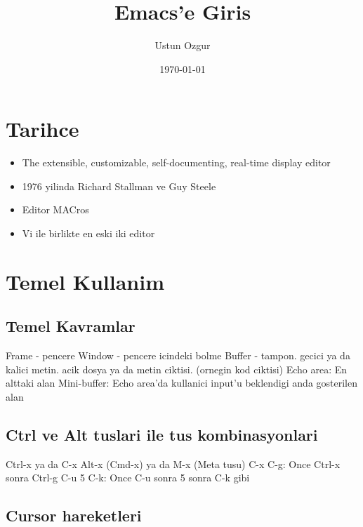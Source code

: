 \documentclass[11pt]{article}
\author{Ustun Ozgur}
\date{\today}
\title{Emacs'e Giris}
\begin{document}
\maketitle
\tableofcontents


\section{Tarihce}
\label{sec-1}
\begin{itemize}
\item The extensible, customizable, self-documenting, real-time display editor
\item 1976 yilinda Richard Stallman ve Guy Steele
\item Editor MACros
\item Vi ile birlikte en eski iki editor
\end{itemize}

\section{Temel Kullanim}
\label{sec-2}

\subsection{Temel Kavramlar}
\label{sec-2-1}

Frame - pencere
Window - pencere icindeki bolme
Buffer - tampon. gecici ya da kalici metin. acik dosya ya da metin ciktisi. (ornegin kod ciktisi)
Echo area: En alttaki alan
Mini-buffer: Echo area'da kullanici input'u beklendigi anda gosterilen alan

\subsection{Ctrl ve Alt tuslari ile tus kombinasyonlari}
\label{sec-2-2}

Ctrl-x ya da C-x
Alt-x (Cmd-x) ya da M-x (Meta tusu)
C-x C-g: Once Ctrl-x sonra Ctrl-g
C-u 5 C-k: Once C-u sonra 5 sonra C-k gibi

\subsection{Cursor hareketleri}
\label{sec-2-3}
\end{document}
